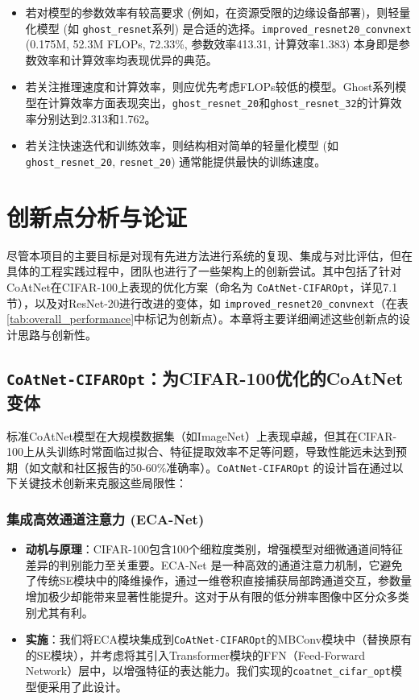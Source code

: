 \documentclass[a4paper]{article}
\begin{document}
\begin{enumerate}
\begin{itemize}
            \item 若对模型的参数效率有较高要求 (例如，在资源受限的边缘设备部署)，则轻量化模型 (如 \texttt{ghost\_resnet}系列) 是合适的选择。\texttt{improved\_resnet20\_convnext} (0.175M, 52.3M FLOPs, 72.33\%, 参数效率413.31, 计算效率1.383) 本身即是参数效率和计算效率均表现优异的典范。
            \item 若关注推理速度和计算效率，则应优先考虑FLOPs较低的模型。Ghost系列模型在计算效率方面表现突出，\texttt{ghost\_resnet\_20}和\texttt{ghost\_resnet\_32}的计算效率分别达到2.313和1.762。
            \item 若关注快速迭代和训练效率，则结构相对简单的轻量化模型 (如 \texttt{ghost\_resnet\_20}, \texttt{resnet\_20}) 通常能提供最快的训练速度。
        \end{itemize}
\end{enumerate}

\section{创新点分析与论证}
尽管本项目的主要目标是对现有先进方法进行系统的复现、集成与对比评估，但在具体的工程实践过程中，团队也进行了一些架构上的创新尝试。其中包括了针对CoAtNet在CIFAR-100上表现的优化方案（命名为 \texttt{CoAtNet-CIFAROpt}，详见7.1节），以及对ResNet-20进行改进的变体，如 \texttt{improved\_resnet20\_convnext}（在表\ref{tab:overall_performance}中标记为创新点）。本章将主要详细阐述这些创新点的设计思路与创新性。

\subsection{\texttt{CoAtNet-CIFAROpt}：为CIFAR-100优化的CoAtNet变体}

标准CoAtNet模型在大规模数据集（如ImageNet）上表现卓越，但其在CIFAR-100上从头训练时常面临过拟合、特征提取效率不足等问题，导致性能远未达到预期（如文献和社区报告的50-60\%准确率）。\texttt{CoAtNet-CIFAROpt} 的设计旨在通过以下关键技术创新来克服这些局限性：

\subsubsection{集成高效通道注意力 (ECA-Net)}
\begin{itemize}
    \item \textbf{动机与原理}：CIFAR-100包含100个细粒度类别，增强模型对细微通道间特征差异的判别能力至关重要。ECA-Net 是一种高效的通道注意力机制，它避免了传统SE模块中的降维操作，通过一维卷积直接捕获局部跨通道交互，参数量增加极少却能带来显著性能提升。这对于从有限的低分辨率图像中区分众多类别尤其有利。
    \item \textbf{实施}：我们将ECA模块集成到\texttt{CoAtNet-CIFAROpt}的MBConv模块中（替换原有的SE模块），并考虑将其引入Transformer模块的FFN（Feed-Forward Network）层中，以增强特征的表达能力。我们实现的\texttt{coatnet\_cifar\_opt}模型便采用了此设计。
\end{itemize}
\end{document}
